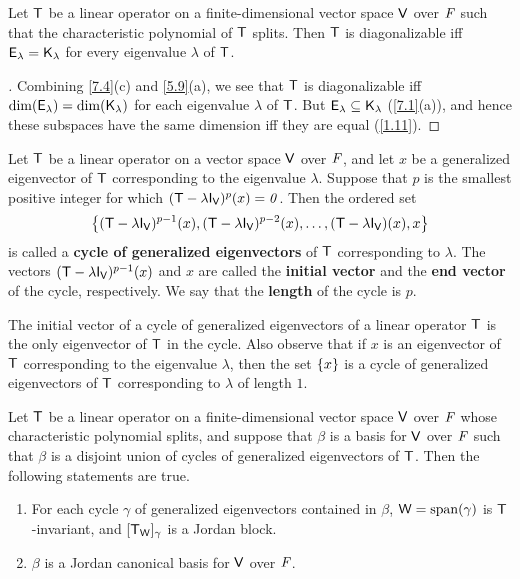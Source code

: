 \begin{cor}\label{7.1.5}
  Let \(\mathsf{T}\) be a linear operator on a finite-dimensional vector space \(\mathsf{V}\) over \(\mathit{F}\) such that the characteristic polynomial of \(\mathsf{T}\) splits.
  Then \(\mathsf{T}\) is diagonalizable iff \(\mathsf{E}_{\lambda} = \mathsf{K}_{\lambda}\) for every eigenvalue \(\lambda\) of \(\mathsf{T}\).
\end{cor}

\begin{proof}[]
  Combining \cref{7.4}(c) and \cref{5.9}(a), we see that \(\mathsf{T}\) is diagonalizable iff \(\dim(\mathsf{E}_{\lambda}) = \dim(\mathsf{K}_{\lambda})\) for each eigenvalue \(\lambda\) of \(\mathsf{T}\).
  But \(\mathsf{E}_{\lambda} \subseteq \mathsf{K}_{\lambda}\) (\cref{7.1}(a)), and hence these subspaces have the same dimension iff they are equal (\cref{1.11}).
\end{proof}

\begin{defn}\label{7.1.6}
  Let \(\mathsf{T}\) be a linear operator on a vector space \(\mathsf{V}\) over \(\mathit{F}\), and let \(x\) be a generalized eigenvector of \(\mathsf{T}\) corresponding to the eigenvalue \(\lambda\).
  Suppose that \(p\) is the smallest positive integer for which \((\T - \lambda \IT[\V])^p(x) = \zv\).
  Then the ordered set
  \[
    \set{(\T - \lambda \IT[\V])^{p - 1}(x), (\T - \lambda \IT[\V])^{p - 2}(x), \dots, (\T - \lambda \IT[\V])(x), x}
  \]
  is called a \textbf{cycle of generalized eigenvectors} of \(\mathsf{T}\) corresponding to \(\lambda\).
  The vectors \((\T - \lambda \IT[\V])^{p - 1}(x)\) and \(x\) are called the \textbf{initial vector} and the \textbf{end vector} of the cycle, respectively.
  We say that the \textbf{length} of the cycle is \(p\).
\end{defn}

\begin{note}
  The initial vector of a cycle of generalized eigenvectors of a linear operator \(\mathsf{T}\) is the only eigenvector of \(\mathsf{T}\) in the cycle.
  Also observe that if \(x\) is an eigenvector of \(\mathsf{T}\) corresponding to the eigenvalue \(\lambda\), then the set \(\left\lbrace x\right\rbrace\) is a cycle of generalized eigenvectors of \(\mathsf{T}\) corresponding to \(\lambda\) of length \(1\).
\end{note}

\begin{thm}\label{7.5}
  Let \(\mathsf{T}\) be a linear operator on a finite-dimensional vector space \(\mathsf{V}\) over \(\mathit{F}\) whose characteristic polynomial splits, and suppose that \(\beta\) is a basis for \(\mathsf{V}\) over \(\mathit{F}\) such that \(\beta\) is a disjoint union of cycles of generalized eigenvectors of \(\mathsf{T}\).
  Then the following statements are true.
  \begin{enumerate}
    \item For each cycle \(\gamma\) of generalized eigenvectors contained in \(\beta\), \(\W = \spn{\gamma}\) is \(\mathsf{T}\)-invariant, and \([\mathsf{T}_{\mathsf{W}}]_{\gamma}\) is a Jordan block.
    \item \(\beta\) is a Jordan canonical basis for \(\mathsf{V}\) over \(\mathit{F}\).
  \end{enumerate}
\end{thm}

